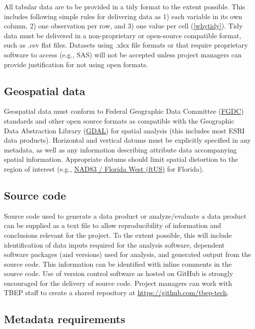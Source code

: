 \documentclass[
]{book}
\begin{document}
All tabular data are to be provided in a tidy format to the extent possible. This includes following simple rules for delivering data as 1) each variable in its own column, 2) one observation per row, and 3) one value per cell (\ref{whytidy}). Tidy data must be delivered in a non-proprietary or open-source compatible format, such as .csv flat files. Datasets using .xlsx file formats or that require proprietary software to access (e.g., SAS) will not be accepted unless project managers can provide justification for not using open formats.

\hypertarget{geospatial-data}{%
\subsection{Geospatial data}\label{geospatial-data}}

Geospatial data must conform to Federal Geographic Data Committee (\href{https://www.fgdc.gov/standards}{FGDC}) standards and other open source formats as compatible with the Geographic Data Abstraction Library (\href{https://gdal.org/}{GDAL}) for spatial analysis (this includes most ESRI data products). Horizontal and vertical datums must be explicitly specified in any metadata, as well as any information describing attribute data accompanying spatial information. Appropriate datums should limit spatial distortion to the region of interest (e.g., \href{https://epsg.io/2237-1714}{NAD83 / Florida West (ftUS)} for Florida).

\hypertarget{source-code}{%
\subsection{Source code}\label{source-code}}

Source code used to generate a data product or analyze/evaluate a data product can be supplied as a text file to allow reproducibility of information and conclusions relevant for the project. To the extent possible, this will include identification of data inputs required for the analysis software, dependent software packages (and versions) used for analysis, and generated output from the source code. This information can be identified with inline comments in the source code. Use of version control software as hosted on GitHub is strongly encouraged for the delivery of source code. Project managers can work with TBEP staff to create a shared repository at \url{https://github.com/tbep-tech}.

\hypertarget{metadata-requirements}{%
\subsection{Metadata requirements}\label{metadata-requirements}}
\end{document}
